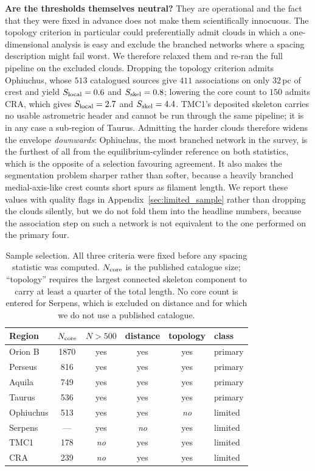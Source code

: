 \documentclass[usenatbib,twoside,twocolumn]{mnras}
\begin{document}
\smallskip\noindent\textbf{Are the thresholds themselves neutral?} They are operational and the fact that they were fixed in advance does not make them scientifically innocuous. The topology criterion in particular could preferentially admit clouds in which a one-dimensional analysis is easy and exclude the branched networks where a spacing description might fail worst. We therefore relaxed them and re-ran the full pipeline on the excluded clouds. Dropping the topology criterion admits Ophiuchus, whose $513$ catalogued sources give $411$ associations on only $32$\,pc of crest and yield $S_{\rm local}=0.6$ and $S_{\rm skel}=0.8$; lowering the core count to $150$ admits CRA, which gives $S_{\rm local}=2.7$ and $S_{\rm skel}=4.4$. TMC1's deposited skeleton carries no usable astrometric header and cannot be run through the same pipeline; it is in any case a sub-region of Taurus. Admitting the harder clouds therefore widens the envelope \emph{downwards}: Ophiuchus, the most branched network in the survey, is the furthest of all from the equilibrium-cylinder reference on both statistics, which is the opposite of a selection favouring agreement. It also makes the segmentation problem sharper rather than softer, because a heavily branched medial-axis-like crest counts short spurs as filament length. We report these values with quality flags in Appendix~\ref{sec:limited_sample} rather than dropping the clouds silently, but we do not fold them into the headline numbers, because the association step on such a network is not equivalent to the one performed on the primary four.


\begin{table}
\caption{Sample selection. All three criteria were fixed before any spacing statistic was computed. $N_{\rm core}$ is the published catalogue size; ``topology'' requires the largest connected skeleton component to carry at least a quarter of the total length. No core count is entered for Serpens, which is excluded on distance and for which we do not use a published catalogue.}
\label{tab:selection}
\footnotesize
\setlength{\tabcolsep}{4pt}
\begin{tabular}{lccccl}
\toprule
Region & $N_{\rm core}$ & $N>500$ & distance & topology & class \\
\midrule
Orion B   & 1870 & yes & yes & yes & primary \\
Perseus   & 816  & yes & yes & yes & primary \\
Aquila    & 749  & yes & yes & yes & primary \\
Taurus    & 536  & yes & yes & yes & primary \\
\midrule
Ophiuchus & 513  & yes & yes & \emph{no} & limited \\
Serpens   & ---  & yes & \emph{no} & yes & limited \\
TMC1      & 178  & \emph{no} & yes & yes & limited \\
CRA       & 239  & \emph{no} & yes & yes & limited \\
\bottomrule
\end{tabular}
\end{table}
\end{document}
